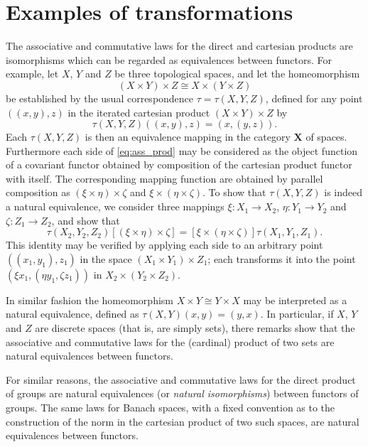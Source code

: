 \documentclass[11pt,a4paper]{report}
\begin{document}
\section{Examples of transformations}\label{sec:trans_ex}
The associative and commutative laws for the direct and cartesian products are isomorphisms which can
be regarded as equivalences between functors. For example, let $X$, $Y$ and $Z$ be three topological
spaces, and let the homeomorphism
\begin{equation}\label{eq:ass_prod}
	(X\times Y)\times Z \cong X\times (Y\times Z)
\end{equation}
be established by the usual correspondence $\tau=\tau(X,Y,Z)$, defined for any point $((x,y),z)$ in the
iterated cartesian product $(X\times Y)\times Z$ by
\begin{equation*}
	\tau(X,Y,Z)((x,y),z) =  (x,(y,z)).
\end{equation*}
Each $\tau(X,Y,Z)$ is then an equivalence mapping in the category $\mathbf{X}$ of spaces.
Furthermore each side of \cref{eq:ass_prod} may be considered as the object function of a covariant functor 
obtained by composition of the cartesian product functor with itself. The corresponding mapping function
are obtained by parallel composition as $(\xi\times\eta)\times\zeta$ and $\xi\times(\eta\times\zeta)$.
To show that $\tau(X,Y,Z)$ is indeed a natural equivalence, we consider three mappings $\xi:X_1\rightarrow X_2$,
$\eta:Y_1\rightarrow Y_2$ and $\zeta:Z_1\rightarrow Z_2$, and show that
\begin{equation*}
	\tau(X_2,Y_2,Z_2)[(\xi\times\eta)\times\zeta] = [\xi\times(\eta\times\zeta)]\tau(X_1,Y_1,Z_1).
\end{equation*}
This identity may be verified by applying each side to an arbitrary point $((x_1,y_1),z_1)$ in the space
$(X_1\times Y_1)\times Z_1$; each transforms it into the point $(\xi x_1,(\eta y_1, \zeta z_1))$ in
$X_2\times(Y_2\times Z_2)$.

In similar fashion the homeomorphism $X\times Y\cong Y\times X$ may be interpreted as a natural equivalence,
defined as $\tau(X,Y)(x,y)= (y,x)$. In particular, if $X$, $Y$ and $Z$ are discrete spaces (that is, are simply
sets), there remarks show that the associative and commutative laws for the (cardinal) product of two sets
are natural equivalences between functors.

For similar reasons, the associative and commutative laws for the direct product of groups are natural
equivalences (or \emph{natural isomorphisms}) between functors of groups. The same laws for Banach spaces, with
a fixed convention as to the construction of the norm in the cartesian product of two such spaces, are natural 
equivalences between functors.
\end{document}

